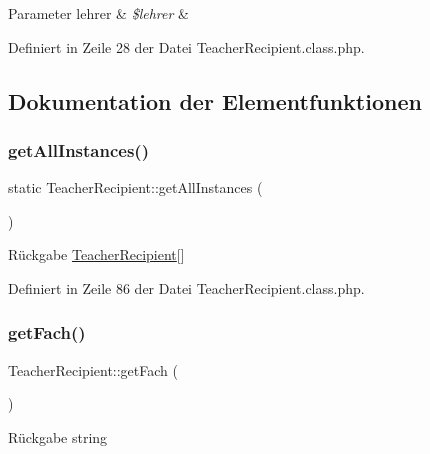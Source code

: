 \begin{DoxyParams}[1]{Parameter}
lehrer & {\em \$lehrer} & \\
\hline
\end{DoxyParams}


Definiert in Zeile 28 der Datei Teacher\+Recipient.\+class.\+php.



\subsection{Dokumentation der Elementfunktionen}
\mbox{\label{class_teacher_recipient_a613bc7631745ecb94d30e4b5de44d550}} 
\subsubsection{\texorpdfstring{get\+All\+Instances()}{getAllInstances()}}
{\footnotesize\ttfamily static Teacher\+Recipient\+::get\+All\+Instances (\begin{DoxyParamCaption}{ }\end{DoxyParamCaption})\hspace{0.3cm}{\ttfamily [static]}}

\begin{DoxyReturn}{Rückgabe}
\mbox{\hyperlink{class_teacher_recipient}{Teacher\+Recipient}}\mbox{[}\mbox{]} 
\end{DoxyReturn}


Definiert in Zeile 86 der Datei Teacher\+Recipient.\+class.\+php.

\mbox{\label{class_teacher_recipient_ab837a1b7c4f59b9b4222b74f135534b5}} 
\subsubsection{\texorpdfstring{get\+Fach()}{getFach()}}
{\footnotesize\ttfamily Teacher\+Recipient\+::get\+Fach (\begin{DoxyParamCaption}{ }\end{DoxyParamCaption})}

\begin{DoxyReturn}{Rückgabe}
string 
\end{DoxyReturn}


